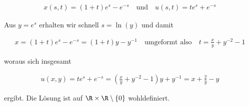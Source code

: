 \begin{solution}
\begin{align*}
    x(s,t) = (1 + t) e^s - e^{-s} \quad \text{und} \quad u(s,t) = t e^s + e^{-s}
\end{align*}

Aus $y = e^s$ erhalten wir schnell $s = \ln(y)$ und damit

\begin{align*}
    x = (1+t) e^s - e^{-s} = (1 + t)y - y^{-1} \quad \text{umgeformt also} \quad t = \frac{x}{y} + y^{-2} - 1
\end{align*}

woraus sich insgesamt

\begin{align*}
    u(x,y) = t e^s + e^{-s} = \left(\frac{x}{y} + y^{-2} - 1 \right) y + y^{-1} = x + \frac{2}{y} - y
\end{align*}

ergibt.
Die Lösung ist auf $\R \times \R \setminus \{0\}$ wohldefiniert.
\end{solution}



